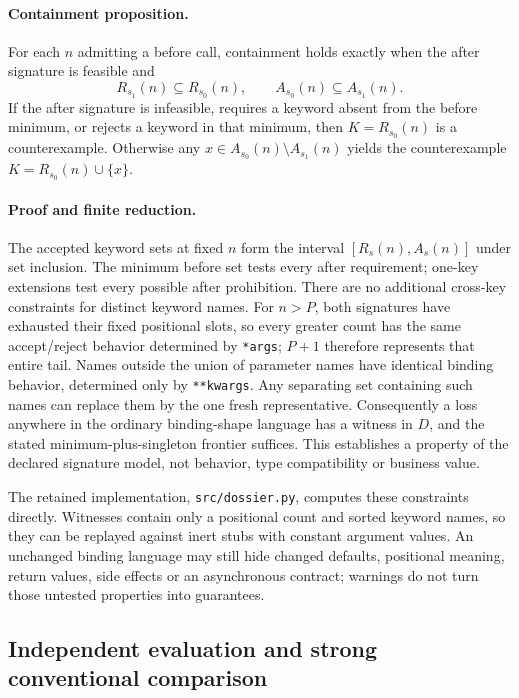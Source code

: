 \documentclass[11pt,letterpaper]{article}
\begin{document}
\paragraph{Containment proposition.}
For each $n$ admitting a before call, containment holds exactly when the
after signature is feasible and
\[
 R_{s_1}(n)\subseteq R_{s_0}(n),
 \qquad A_{s_0}(n)\subseteq A_{s_1}(n).
\]
If the after signature is infeasible, requires a keyword absent from the
before minimum, or rejects a keyword in that minimum, then
$K=R_{s_0}(n)$ is a counterexample. Otherwise any
$x\in A_{s_0}(n)\setminus A_{s_1}(n)$ yields the counterexample
$K=R_{s_0}(n)\cup\{x\}$.

\paragraph{Proof and finite reduction.}
The accepted keyword sets at fixed $n$ form the interval
$[R_s(n),A_s(n)]$ under set inclusion. The minimum before set tests every
after requirement; one-key extensions test every possible after prohibition.
There are no additional cross-key constraints for distinct keyword names.
For $n>P$, both signatures have exhausted their fixed positional slots, so
every greater count has the same accept/reject behavior determined by
\texttt{*args}; $P+1$ therefore represents that entire tail. Names outside
the union of parameter names have identical binding behavior, determined
only by \texttt{**kwargs}. Any separating set containing such names can
replace them by the one fresh representative. Consequently a loss anywhere
in the ordinary binding-shape language has a witness in $D$, and the stated
minimum-plus-singleton frontier suffices. This establishes a property of the
declared signature model, not behavior, type compatibility or business value.

The retained implementation, \texttt{src/dossier.py}, computes these
constraints directly. Witnesses contain only a positional count and sorted
keyword names, so they can be replayed against inert stubs with constant
argument values. An unchanged binding language may still hide changed
defaults, positional meaning, return values, side effects or an asynchronous
contract; warnings do not turn those untested properties into guarantees.

\subsection{Independent evaluation and strong conventional comparison}
\end{document}
